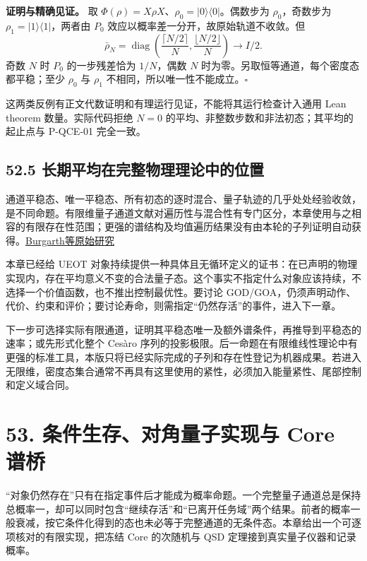 \documentclass[
  11pt,
  oneside]{book}
\begin{document}
\textbf{证明与精确见证。} 取
\(\Phi(\rho)=X\rho X\)、\(\rho_0=|0\rangle\langle0|\)。偶数步为
\(\rho_0\)，奇数步为 \(\rho_1=|1\rangle\langle1|\)，两者由 \(P_0\)
效应以概率差一分开，故原始轨道不收敛。但 \[
\bar\rho_N=\operatorname{diag}\left(\frac{\lceil N/2\rceil}{N},
\frac{\lfloor N/2\rfloor}{N}\right)\longrightarrow I/2.
\] 奇数 \(N\) 时 \(P_0\) 的一步残差恰为 \(1/N\)，偶数 \(N\)
时为零。另取恒等通道，每个密度态都平稳；至少 \(\rho_0\) 与 \(\rho_1\)
不相同，所以唯一性不能成立。\(\square\)

这两类反例有正文代数证明和有理运行见证，不能将其运行检查计入通用 Lean
theorem 数量。实际代码拒绝 \(N=0\)
的平均、非整数步数和非法初态；其平均的起止点与 P-QCE-01 完全一致。

\hypertarget{ux957fux671fux5e73ux5747ux5728ux5b8cux6574ux7269ux7406ux7406ux8bbaux4e2dux7684ux4f4dux7f6e}{%
\section{52.5
长期平均在完整物理理论中的位置}\label{ux957fux671fux5e73ux5747ux5728ux5b8cux6574ux7269ux7406ux7406ux8bbaux4e2dux7684ux4f4dux7f6e}}

通道平稳态、唯一平稳态、所有初态的逐时混合、量子轨迹的几乎处处经验收敛，是不同命题。有限维量子通道文献对遍历性与混合性有专门区分，本章使用与之相容的有限存在性范围；更强的谱结构及均值遍历结果没有由本轮的子列证明自动获得。\href{https://arxiv.org/abs/1210.5625}{Burgarth等原始研究}

本章已经给 UEOT
对象持续提供一种具体且无循环定义的证书：在已声明的物理实现内，存在平均意义不变的合法量子态。这个事实不指定什么对象应该持续，不选择一个价值函数，也不推出控制最优性。要讨论
GOD/GOA，仍须声明动作、代价、约束和评价；要讨论寿命，则需指定``仍然存活''的事件，进入下一章。

下一步可选择实际有限通道，证明其平稳态唯一及额外谱条件，再推导到平稳态的速率；或先形式化整个
Cesàro
序列的投影极限。后一命题在有限维线性理论中有更强的标准工具，本版只将已经实际完成的子列和存在性登记为机器成果。若进入无限维，密度态集合通常不再具有这里使用的紧性，必须加入能量紧性、尾部控制和定义域合同。

\hypertarget{ch-53}{%
\chapter{53. 条件生存、对角量子实现与 Core 谱桥}\label{ch-53}}

``对象仍然存在''只有在指定事件后才能成为概率命题。一个完整量子通道总是保持总概率一，却可以同时包含``继续存活''和``已离开任务域''两个结果。前者的概率一般衰减，按它条件化得到的态也未必等于完整通道的无条件态。本章给出一个可逐项核对的有限实现，把冻结
Core 的次随机与 QSD 定理接到真实量子仪器和记录概率。
\end{document}

